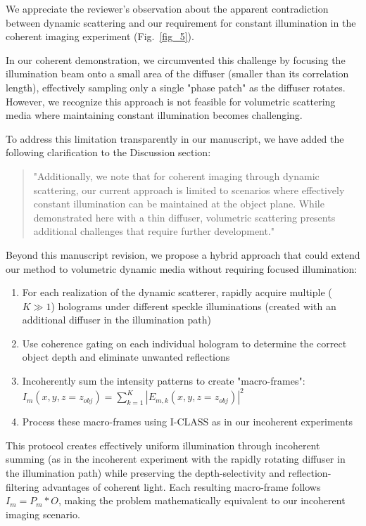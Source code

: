 \documentclass[12pt]{article}
\newenvironment{ourresponse}
    {\begin{tcolorbox}[width=\linewidth,breakable,enhanced,colback=gray!5,colframe=responsecolor!50,title=Response,left=5pt,right=5pt]}
    {\end{tcolorbox}}
\begin{document}
\begin{ourresponse}
    We appreciate the reviewer's observation about the apparent contradiction between dynamic scattering and our requirement for constant illumination in the coherent imaging experiment (Fig.~\ref{fig_5}). 
    
    In our coherent demonstration, we circumvented this challenge by focusing the illumination beam onto a small area of the diffuser (smaller than its correlation length), effectively sampling only a single "phase patch" as the diffuser rotates. However, we recognize this approach is not feasible for volumetric scattering media where maintaining constant illumination becomes challenging.
    
    To address this limitation transparently in our manuscript, we have added the following clarification to the Discussion section:
    
    \begin{quote}
        "Additionally, we note that for coherent imaging through dynamic scattering, our current approach is limited to scenarios where effectively constant illumination can be maintained at the object plane. While demonstrated here with a thin diffuser, volumetric scattering presents additional challenges that require further development."
    \end{quote}
    
    Beyond this manuscript revision, we propose a hybrid approach that could extend our method to volumetric dynamic media without requiring focused illumination:
    \begin{enumerate}
        \item For each realization of the dynamic scatterer, rapidly acquire multiple ($K \gg 1$) holograms under different speckle illuminations (created with an additional diffuser in the illumination path)
        \item Use coherence gating on each individual hologram to determine the correct object depth and eliminate unwanted reflections
        \item Incoherently sum the intensity patterns to create "macro-frames": $I_m(x,y,z=z_{obj}) = \sum_{k=1}^{K}|E_{m,k}(x,y,z=z_{obj})|^2$ 
        \item Process these macro-frames using I-CLASS as in our incoherent experiments
    \end{enumerate}
    
    This protocol creates effectively uniform illumination through incoherent summing (as in the incoherent experiment with the rapidly rotating diffuser in the illumination path) while preserving the depth-selectivity and reflection-filtering advantages of coherent light. Each resulting macro-frame follows $I_m = P_m * O$, making the problem mathematically equivalent to our incoherent imaging scenario.
    

\end{ourresponse}
\end{document}
